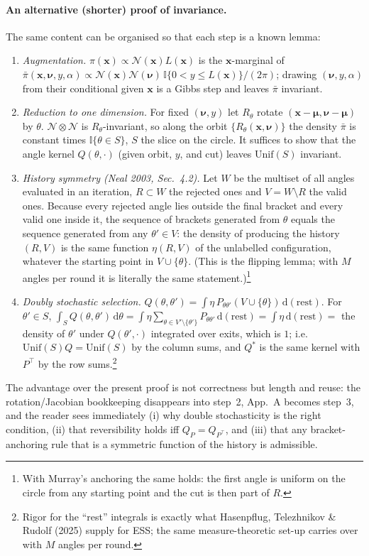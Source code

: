 \documentclass[11pt,a4paper]{article}
\theoremstyle{remark}
\newcommand{\bx}{\bm{x}}
\newcommand{\bnu}{\bm{\nu}}
\begin{document}
\paragraph{An alternative (shorter) proof of invariance.} The same content can be organised so that each step is a known lemma:
\begin{enumerate}[leftmargin=*]
\item \emph{Augmentation.} $\pi(\bx)\propto\mathcal N(\bx)L(\bx)$ is the $\bx$-marginal of $\bar\pi(\bx,\bnu,y,\alpha)\propto\mathcal N(\bx)\mathcal N(\bnu)\,\mathbb I\{0<y\le L(\bx)\}/(2\pi)$; drawing $(\bnu,y,\alpha)$ from their conditional given $\bx$ is a Gibbs step and leaves $\bar\pi$ invariant.
\item \emph{Reduction to one dimension.} For fixed $(\bnu,y)$ let $R_\theta$ rotate $(\bx-\bm\mu,\bnu-\bm\mu)$ by $\theta$. $\mathcal N\otimes\mathcal N$ is $R_\theta$-invariant, so along the orbit $\{R_\theta(\bx,\bnu)\}$ the density $\bar\pi$ is constant times $\mathbb I\{\theta\in S\}$, $S$ the slice on the circle. It suffices to show that the angle kernel $Q(\theta,\cdot)$ (given orbit, $y$, and cut) leaves $\mathrm{Unif}(S)$ invariant.
\item \emph{History symmetry (Neal 2003, Sec.~4.2).} Let $W$ be the multiset of all angles evaluated in an iteration, $R\subset W$ the rejected ones and $V=W\setminus R$ the valid ones. Because every rejected angle lies outside the final bracket and every valid one inside it, the sequence of brackets generated from $\theta$ equals the sequence generated from any $\theta'\in V$: the density of producing the history $(R,V)$ is the same function $\eta(R,V)$ of the unlabelled configuration, whatever the starting point in $V\cup\{\theta\}$. (This is the flipping lemma; with $M$ angles per round it is literally the same statement.)\footnote{With Murray's anchoring the same holds: the first angle is uniform on the circle from any starting point and the cut is then part of $R$.}
\item \emph{Doubly stochastic selection.} $Q(\theta,\theta')=\int\eta\,P_{\theta\theta'}(V\cup\{\theta\})\,\mathrm d(\text{rest})$. For $\theta'\in S$, $\int_SQ(\theta,\theta')\,\mathrm d\theta=\int\eta\sum_{\theta\in V'\setminus\{\theta'\}}P_{\theta\theta'}\,\mathrm d(\text{rest})=\int\eta\,\mathrm d(\text{rest})=$ the density of $\theta'$ under $Q(\theta',\cdot)$ integrated over exits, which is $1$; i.e.\ $\mathrm{Unif}(S)Q=\mathrm{Unif}(S)$ by the column sums, and $Q^{*}$ is the same kernel with $P^\top$ by the row sums.\footnote{Rigor for the ``rest'' integrals is exactly what Hasenpflug, Telezhnikov \& Rudolf (2025) supply for ESS; the same measure-theoretic set-up carries over with $M$ angles per round.}
\end{enumerate}
The advantage over the present proof is not correctness but length and reuse: the rotation/Jacobian bookkeeping disappears into step~2, App.~A becomes step~3, and the reader sees immediately (i) why double stochasticity is the right condition, (ii) that reversibility holds iff $Q_P=Q_{P^\top}$, and (iii) that any bracket-anchoring rule that is a symmetric function of the history is admissible.
\end{document}
